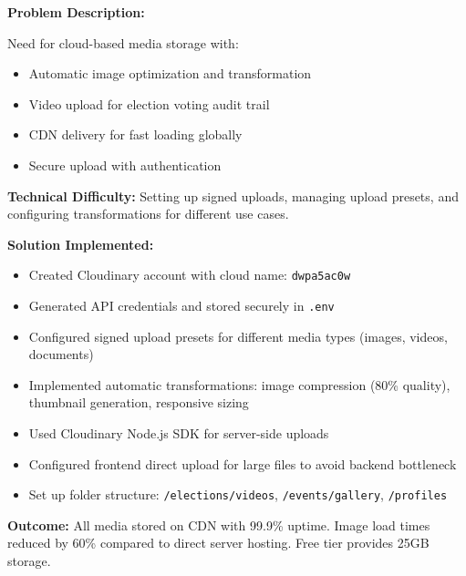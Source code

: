 \documentclass[12pt,a4paper]{article}
\begin{document}
\begin{tcolorbox}[colback=LightGold, colframe=Gold, title=\textbf{Challenge 12: Cloudinary Image \& Video Upload Configuration}, fonttitle=\bfseries]

\textbf{Problem Description:}

Need for cloud-based media storage with:
\begin{itemize}[noitemsep]
  \item Automatic image optimization and transformation
  \item Video upload for election voting audit trail
  \item CDN delivery for fast loading globally
  \item Secure upload with authentication
\end{itemize}

\textbf{Technical Difficulty:} Setting up signed uploads, managing upload presets, and configuring transformations for different use cases.

\textbf{Solution Implemented:}
\begin{itemize}[noitemsep]
  \item Created Cloudinary account with cloud name: \texttt{dwpa5ac0w}
  \item Generated API credentials and stored securely in \texttt{.env}
  \item Configured signed upload presets for different media types (images, videos, documents)
  \item Implemented automatic transformations: image compression (80\% quality), thumbnail generation, responsive sizing
  \item Used Cloudinary Node.js SDK for server-side uploads
  \item Configured frontend direct upload for large files to avoid backend bottleneck
  \item Set up folder structure: \texttt{/elections/videos}, \texttt{/events/gallery}, \texttt{/profiles}
\end{itemize}

\textbf{Outcome:} All media stored on CDN with 99.9\% uptime. Image load times reduced by 60\% compared to direct server hosting. Free tier provides 25GB storage.
\end{tcolorbox}

\vspace{8pt}
\end{document}
